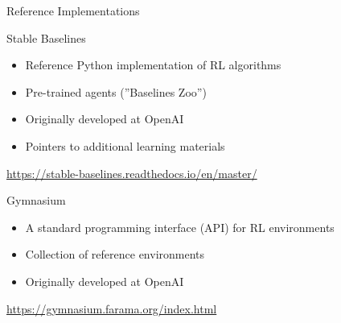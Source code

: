 \documentclass[ignorenonframetext,xcolor=x11names]{beamer}
\begin{document}
\begin{frame}{Reference Implementations}
\small
\begin{block}{Stable Baselines}
\begin{itemize}
   \item Reference Python implementation of RL algorithms
   \item Pre-trained agents (''Baselines Zoo'')
   \item Originally developed at OpenAI
   \item Pointers to additional learning materials
\end{itemize}
\vspace{.5\baselineskip}
\url{https://stable-baselines.readthedocs.io/en/master/}
\end{block}
\begin{block}{Gymnasium}
\begin{itemize}
   \item A standard programming interface (API) for RL environments
   \item Collection of reference environments
   \item Originally developed at OpenAI
\end{itemize}
\vspace{.5\baselineskip}
\url{https://gymnasium.farama.org/index.html}
\end{block}
\end{frame}
\end{document}
